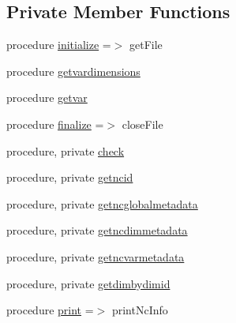 \subsection*{Private Member Functions}
\begin{DoxyCompactItemize}
\item 
procedure \mbox{\hyperlink{structnetcdfparser__mod_1_1ncfile__class_a5f736ec85f6aff6ea52407d3f47cd4a1}{initialize}} =$>$ get\+File
\item 
procedure \mbox{\hyperlink{structnetcdfparser__mod_1_1ncfile__class_a6d381b153b3aca351ddafc042834a96b}{getvardimensions}}
\item 
procedure \mbox{\hyperlink{structnetcdfparser__mod_1_1ncfile__class_a616823bed0c99a683741ce8398898b72}{getvar}}
\item 
procedure \mbox{\hyperlink{structnetcdfparser__mod_1_1ncfile__class_a62c3404b0742346374753743e349e6f1}{finalize}} =$>$ close\+File
\item 
procedure, private \mbox{\hyperlink{structnetcdfparser__mod_1_1ncfile__class_a2b41dc377688a881f9252bd4fc09bec9}{check}}
\item 
procedure, private \mbox{\hyperlink{structnetcdfparser__mod_1_1ncfile__class_a78eb48e6493c1f48f44b89517addf2bc}{getncid}}
\item 
procedure, private \mbox{\hyperlink{structnetcdfparser__mod_1_1ncfile__class_a8fc97bc9b7ed5f74d29436dfc527d6e2}{getncglobalmetadata}}
\item 
procedure, private \mbox{\hyperlink{structnetcdfparser__mod_1_1ncfile__class_aace24549667b19d98fd2220684e34b64}{getncdimmetadata}}
\item 
procedure, private \mbox{\hyperlink{structnetcdfparser__mod_1_1ncfile__class_a87e2ab9be12dd33782a39be6103c05b4}{getncvarmetadata}}
\item 
procedure, private \mbox{\hyperlink{structnetcdfparser__mod_1_1ncfile__class_a3d0ee52a9df4b11f8566592fa283202a}{getdimbydimid}}
\item 
procedure \mbox{\hyperlink{structnetcdfparser__mod_1_1ncfile__class_af7aae078c0672cbfe8e6667311a94dcd}{print}} =$>$ print\+Nc\+Info
\end{DoxyCompactItemize}
